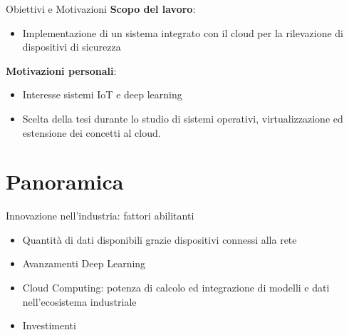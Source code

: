 \documentclass{beamer}
\begin{document}
\begin{frame}{Obiettivi e Motivazioni}
\textbf{Scopo del lavoro}:
\begin{itemize}
\vspace{0.2cm}
	\item Implementazione di un sistema integrato con il cloud per la rilevazione di dispositivi di sicurezza    
\end{itemize}
\vspace{0.3cm}
\textbf{Motivazioni personali}:
\begin{itemize}
    \item Interesse sistemi IoT e deep learning
    \item Scelta della tesi durante lo studio di sistemi operativi, virtualizzazione ed estensione dei concetti al cloud.
\end{itemize}
\end{frame}







\section{Panoramica}

\begin{frame}{Innovazione nell'industria: fattori abilitanti}
\begin{itemize}
	\item Quantità di dati disponibili grazie dispositivi connessi alla rete
	\item Avanzamenti Deep Learning
	\item Cloud Computing: potenza di calcolo ed integrazione di modelli e dati nell'ecosistema industriale
	\item Investimenti
\end{itemize}
\end{frame}
\end{document}
